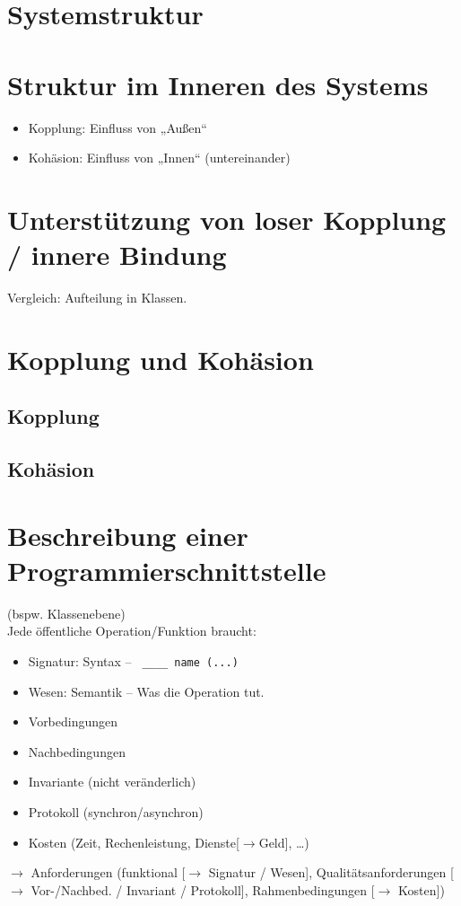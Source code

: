 \documentclass{scrreprt}
\begin{document}
\section{Systemstruktur}
\section{Struktur im Inneren des Systems}
\begin{itemize}
\item Kopplung: Einfluss von „Außen“
\item Kohäsion: Einfluss von „Innen“ (untereinander)
\end{itemize}
\section{Unterstützung von loser Kopplung / innere Bindung}
Vergleich: Aufteilung in Klassen.
\section{Kopplung und Kohäsion}
\subsection{Kopplung}
\subsection{Kohäsion}
\section{Beschreibung einer Programmierschnittstelle}
(bspw. Klassenebene)\\
Jede öffentliche Operation/Funktion braucht:
\begin{itemize}
\item Signatur: Syntax -- \lstinline$ ____ name (...)$
\item Wesen: Semantik -- Was die Operation tut.
\item Vorbedingungen
\item Nachbedingungen
\item Invariante (nicht veränderlich)
\item Protokoll (synchron/asynchron)
\item Kosten (Zeit, Rechenleistung, Dienste[$\to$Geld], …)
\end{itemize}
$\to$ Anforderungen (funktional [$\to$ Signatur / Wesen], Qualitätsanforderungen [$\to$ Vor-/Nachbed. / Invariant / Protokoll], Rahmenbedingungen [$\to$ Kosten])
\end{document}
